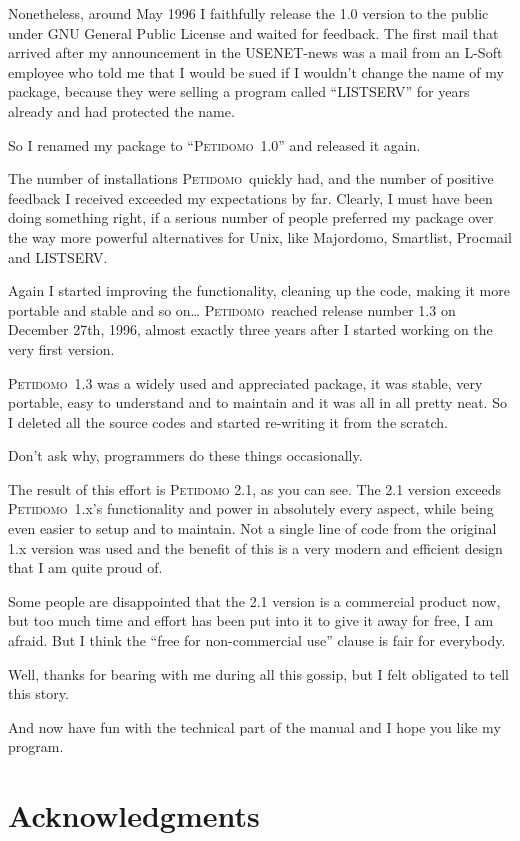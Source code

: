 \documentclass[a4paper]{report}
\newcommand{\Petidomo}{{\scshape Peti\-domo}}
\newcommand{\PetidomoTwo}{{\scshape Peti\-domo 2.1}}
\begin{document}
Nonetheless, around May 1996 I faithfully release the 1.0 version to
the public under GNU General Public License and waited for feedback.
The first mail that arrived after my announcement in the USENET-news
was a mail from an L-Soft employee who told me that I would be sued if
I wouldn't change the name of my package, because they were selling a
program called ``LISTSERV'' for years already and had protected the
name.

So I renamed my package to ``\Petidomo\ 1.0'' and released it again.

The number of installations \Petidomo\ quickly had, and the number of
positive feedback I received exceeded my expectations by far. Clearly,
I must have been doing something right, if a serious number of people
preferred my package over the way more powerful alternatives for Unix,
like Majordomo, Smartlist, Procmail and LISTSERV.

Again I started improving the functionality, cleaning up the code,
making it more portable and stable and so on\dots{} \Petidomo\ reached
release number 1.3 on December 27th, 1996, almost exactly three years
after I started working on the very first version.

\Petidomo\ 1.3 was a widely used and appreciated package, it was stable,
very portable, easy to understand and to maintain and it was all in
all pretty neat. So I deleted all the source codes and started
re-writing it from the scratch.

Don't ask why, programmers do these things occasionally.

The result of this effort is \PetidomoTwo, as you can see. The 2.1
version exceeds \Petidomo\ 1.x's functionality and power in absolutely
every aspect, while being even easier to setup and to maintain. Not a
single line of code from the original 1.x version was used and the
benefit of this is a very modern and efficient design that I am quite
proud of.

Some people are disappointed that the 2.1 version is a commercial
product now, but too much time and effort has been put into it to give
it away for free, I am afraid. But I think the ``free for
non-commercial use'' clause is fair for everybody.

Well, thanks for bearing with me during all this gossip, but I felt
obligated to tell this story.

And now have fun with the technical part of the manual and I hope you
like my program.

\section{Acknowledgments}
\end{document}
